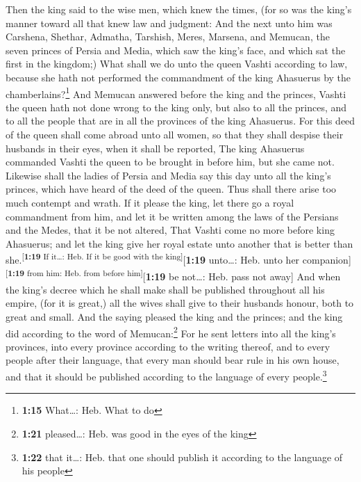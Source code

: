  Then the king said to the wise men, which knew the
times, (for so was the king's manner toward all that knew law and
judgment:  And the next unto him was Carshena, Shethar,
Admatha, Tarshish, Meres, Marsena, and Memucan, the seven princes of
Persia and Media, which saw the king's face, and which sat the first in
the kingdom;)  What shall we do unto the queen Vashti
according to law, because she hath not performed the commandment of the
king Ahasuerus by the chamberlains?\footnote{\textbf{1:15} What\ldots:
  Heb. What to do}  And Memucan answered before the king
and the princes, Vashti the queen hath not done wrong to the king only,
but also to all the princes, and to all the people that are in all the
provinces of the king Ahasuerus.  For this deed of the
queen shall come abroad unto all women, so that they shall despise their
husbands in their eyes, when it shall be reported, The king Ahasuerus
commanded Vashti the queen to be brought in before him, but she came
not.  Likewise shall the ladies of Persia and Media say
this day unto all the king's princes, which have heard of the deed of
the queen. Thus shall there arise too much contempt and wrath.
 If it please the king, let there go a royal commandment
from him, and let it be written among the laws of the Persians and the
Medes, that it be not altered, That Vashti come no more before king
Ahasuerus; and let the king give her royal estate unto another that is
better than she.\textsuperscript{{[}\textbf{1:19} If it\ldots: Heb. If
it be good with the king{]}}{[}\textbf{1:19} unto\ldots: Heb. unto her
companion{]}\textsuperscript{{[}\textbf{1:19} from him: Heb. from before
him{]}}{[}\textbf{1:19} be not\ldots: Heb. pass not away{]}
 And when the king's decree which he shall make shall be
published throughout all his empire, (for it is great,) all the wives
shall give to their husbands honour, both to great and small.
 And the saying pleased the king and the princes; and the
king did according to the word of Memucan:\footnote{\textbf{1:21}
  pleased\ldots: Heb. was good in the eyes of the king} 
For he sent letters into all the king's provinces, into every province
according to the writing thereof, and to every people after their
language, that every man should bear rule in his own house, and that it
should be published according to the language of every
people.\footnote{\textbf{1:22} that it\ldots: Heb. that one should
  publish it according to the language of his people}

